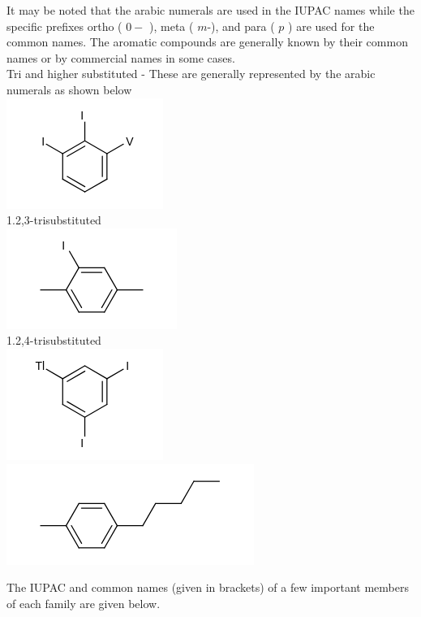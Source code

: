 \documentclass[10pt]{article}
\begin{document}
It may be noted that the arabic numerals are used in the IUPAC names while the specific prefixes ortho ( $0-$ ), meta ( $m$-), and para ( $p$ ) are used for the common names. The aromatic compounds are generally known by their common names or by commercial names in some cases.\\
Tri and higher substituted - These are generally represented by the arabic numerals as shown below\\
\includegraphics{smile-5601086ce852da0481d9d985b5dee7e01db1685b}\\
1.2,3-trisubstituted\\
\includegraphics{smile-889d26e2d61532b33c1b60e0d09ee90b15471f4a}\\
1.2,4-trisubstituted\\
\includegraphics{smile-cf1db54b0a29d8566dba6e055ca4756f9ffdb6a1}\\
\includegraphics{smile-2582038a723ef2c8f1ad674082109f01057acd5b}

The IUPAC and common names (given in brackets) of a few important members of each family are given below.
\end{document}
